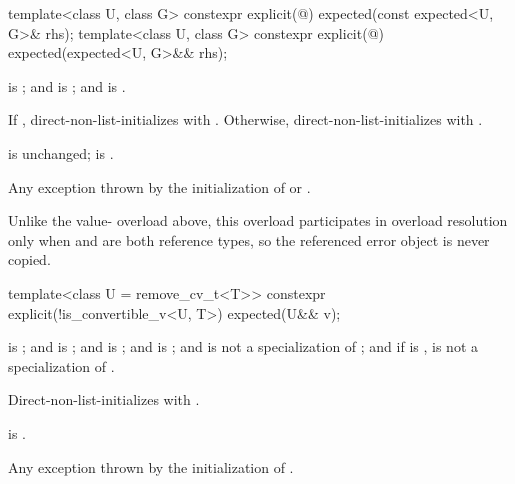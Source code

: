 %
\begin{itemdecl}
template<class U, class G>
  constexpr explicit(@\seebelow@) expected(const expected<U, G>& rhs);
template<class U, class G>
  constexpr explicit(@\seebelow@) expected(expected<U, G>&& rhs);
\end{itemdecl}

\begin{itemdescr}
\pnum
\constraints
{} is ; and  is ; and  is .

\pnum
\effects
If , direct-non-list-initializes  with . Otherwise, direct-non-list-initializes  with .

\pnum
\ensures
{} is unchanged;  is .

\pnum
\throws
Any exception thrown by the initialization of  or .

\pnum
\remarks
Unlike the value- overload above, this overload participates in overload resolution only when  and  are both reference types, so the referenced error object is never copied.
\end{itemdescr}

%
\begin{itemdecl}
template<class U = remove_cv_t<T>>
  constexpr explicit(!is_convertible_v<U, T>) expected(U&& v);
\end{itemdecl}

\begin{itemdescr}
\pnum
\constraints
{} is ; and  is ; and  is ; and  is ; and  is not a specialization of ; and if  is \cv{} ,  is not a specialization of .

\pnum
\effects
Direct-non-list-initializes  with .

\pnum
\ensures
{} is .

\pnum
\throws
Any exception thrown by the initialization of .
\end{itemdescr}

